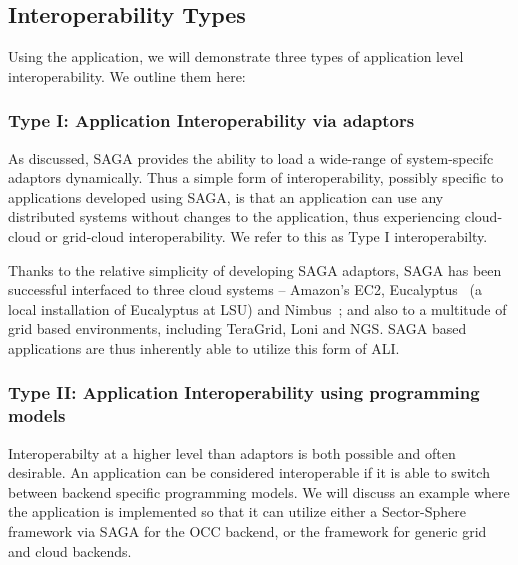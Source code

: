 \documentclass[3p,twocolumn]{elsarticle}
\begin{document}
\subsection{Interoperability Types}

Using the \wc application, we will demonstrate three types of
application level interoperability. We outline them here:


\subsubsection{Type I: Application Interoperability via adaptors}
%
%

As discussed, SAGA provides the ability to load a wide-range of
system-specifc adaptors dynamically. Thus a simple form of
interoperability, possibly specific to applications developed using
SAGA, is that an application can use any distributed systems without
changes to the application, thus experiencing cloud-cloud or
grid-cloud interoperability.  We refer to this as Type I
interoperabilty.


Thanks to the relative simplicity of developing SAGA adaptors, SAGA
has been successful interfaced to three cloud systems -- Amazon's EC2,
Eucalyptus~\cite{eucalyptus} (a local installation of Eucalyptus at
LSU) and Nimbus~\cite{nimbus}; and also to a multitude of grid based
environments, including TeraGrid, Loni and NGS.  SAGA based
applications are thus inherently able to utilize this form of ALI.

\subsubsection{Type II: Application Interoperability using programming
  models} %
%
%

Interoperabilty at a higher level than adaptors is both possible and
often desirable. An application can be considered interoperable if it
is able to switch between backend specific programming models.  We
will discuss an example where the \wc application is implemented so
that it can utilize either a Sector-Sphere framework via SAGA for the
OCC backend, or the \smr framework for generic grid and cloud
backends.
\end{document}
